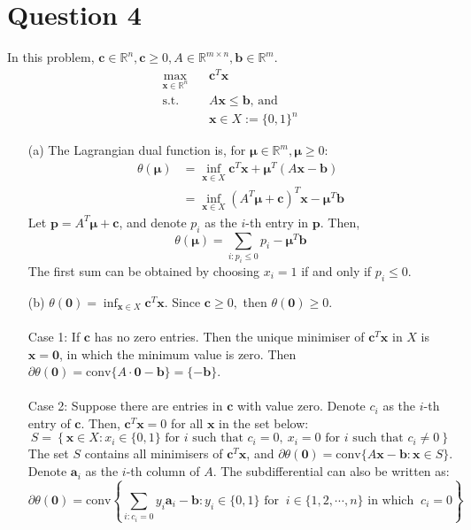 \documentclass{article}
\begin{document}
\newpage \section*{Question 4}
In this problem, $\mathbf{c}\in\mathbb{R}^n, \mathbf{c}\geq0, A\in\mathbb{R}^{m \times n}, \mathbf{b}\in\mathbb{R}^m$. 
\begin{align*}
\max_{\mathbf{x}\in\mathbb{R}^n} \ \ \ \ & \mathbf{c}^T\mathbf{x}\\
    \text{s.t. } \ \ \ & A\mathbf{x\leq b} \text{, and}\\&
    \mathbf{x}\in X:=\{0,1\}^n
\end{align*}
\begin{itemize}
\item[(a)] The Lagrangian dual function is, for $\boldsymbol\mu\in\mathbb{R}^m, \boldsymbol\mu\geq0$:
\begin{align*}
\theta(\boldsymbol\mu) &= \inf_{\mathbf{x}\in X} \mathbf{c}^T\mathbf{x} +\boldsymbol\mu^T\left(A\mathbf{x-b}\right)\\&= \inf_{\mathbf{x}\in X} \left(A^T\boldsymbol\mu+\mathbf{c}\right)^T\mathbf{x} -\boldsymbol\mu^T\mathbf{b}
\end{align*}
Let $\mathbf{p} =A^T\boldsymbol\mu+\mathbf{c}$, and denote $p_i$ as the $i$-th entry in $\mathbf{p}$. Then, 
\[\theta(\boldsymbol\mu) = \sum_{i: p_i\leq0}p_i - \boldsymbol\mu^T\mathbf{b}
\]
The first sum can be obtained by choosing $x_i=1$ if and only if $p_i\leq0$. 
\item[(b)] $\theta(\mathbf{0}) = \inf_{\mathbf{x}\in X}\mathbf{c}^T\mathbf{x}$. Since $\mathbf{c}\geq0,$ then $\theta(\mathbf{0})\geq0$. \\ \\
Case 1: If $\mathbf{c}$ has no zero entries. Then the unique minimiser of $\mathbf{c}^T\mathbf{x}$ in $X$  is $\mathbf{x}=\mathbf{0}$, in which the minimum value is zero. Then $\partial \theta(\mathbf{0}) =\text{conv} \{A\cdot\mathbf{0}-\mathbf{b}\} =\{-\mathbf{b}\}$.\\
\\
Case 2: Suppose there are entries in $\mathbf{c}$ with value zero. Denote $c_i$ as the $i$-th entry of $\mathbf{c}$. Then, $\mathbf{c}^T\mathbf{x} = 0$ for all $\mathbf{x}$ in the set below:\[
S = \left\{\mathbf{x}\in X: x_i\in\{0,1\} \text{ for } i \text{ such that }c_i = 0, \ x_i = 0 \text{ for } i \text{ such that } c_i\neq 0\right\}
\]
The set $S$ contains all minimisers of $\mathbf{c}^T\mathbf{x}$, and $\partial \theta(\mathbf{0}) =\text{conv} \{A\mathbf{x}-\mathbf{b}: \mathbf{x}\in S\}$. Denote $\mathbf{a}_i$ as the $i$-th column of $A$. The subdifferential can also be written as:\[
\partial\theta(\mathbf{0}) = \text{conv}\left\{\sum_{i: c_i = 0} y_i\mathbf{a}_i-\mathbf{b}: y_i \in \{0,1\} \text{ for } \ i\in\{1,2,\cdots,n\} \text{ in which } \ c_i=0\right\}
\]
\end{itemize}
\newpage
\end{document}
